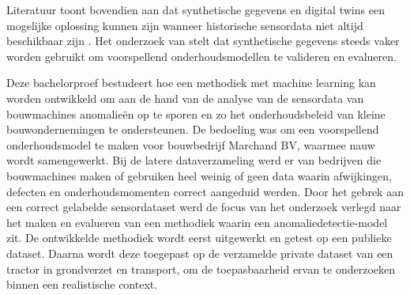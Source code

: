 Literatuur toont bovendien aan dat synthetische gegevens en digital twins een mogelijke oplossing kunnen zijn wanneer historische sensordata niet altijd beschikbaar zijn \autocite{Meddaoui2024, Hu2024}. Het onderzoek van \textcite{Nieminen2026} stelt dat synthetische gegevens steeds vaker worden gebruikt om voorspellend onderhoudsmodellen te valideren en evalueren.

Deze bachelorproef bestudeert hoe een methodiek met machine learning kan worden ontwikkeld om aan de hand van de analyse van de sensordata van bouwmachines anomalieën op te sporen en zo het onderhoudsbeleid van kleine bouwondernemingen te ondersteunen. De bedoeling was om een voorspellend onderhoudsmodel te maken voor bouwbedrijf Marchand BV, waarmee nauw wordt samengewerkt. Bij de latere dataverzameling werd er van bedrijven die bouwmachines maken of gebruiken heel weinig of geen data waarin afwijkingen, defecten en onderhoudsmomenten correct aangeduid werden. Door het gebrek aan een correct gelabelde sensordataset werd de focus van het onderzoek verlegd naar het maken en evalueren van een methodiek waarin een anomaliedetectie-model zit. De ontwikkelde methodiek wordt eerst uitgewerkt en getest op een publieke dataset. Daarna wordt deze toegepast op de verzamelde private dataset van een tractor in grondverzet en transport, om de toepasbaarheid ervan te onderzoeken binnen een realistische context.


\section{}%
\label{sec:probleemstelling}


